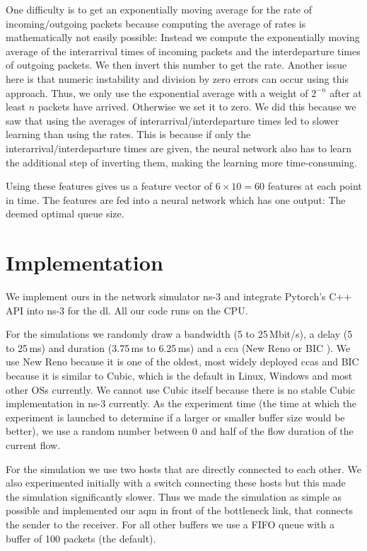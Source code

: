 \documentclass[conference]{IEEEtran}
\begin{document}
One difficulty is to get an exponentially moving average for the rate of incoming/outgoing packets because computing the average of rates is mathematically not easily possible: Instead we compute the exponentially moving average of the interarrival times of incoming packets and the interdeparture times of outgoing packets. We then invert this number to get the rate. Another issue here is that numeric instability and division by zero errors can occur using this approach. Thus, we only use the exponential average with a weight of $2^{-n}$ after at least $n$ packets have arrived. Otherwise we set it to zero. We did this because we saw that using the averages of interarrival/interdeparture times led to slower learning than using the rates. This is because if only the interarrival/interdeparture times are given, the neural network also has to learn the additional step of inverting them, making the learning more time-consuming. 

Using these features gives us a feature vector of $6\times 10 = 60$ features at each point in time. The features are fed into a neural network which has one output: The deemed optimal queue size.  

\section{Implementation} 

We implement \gls{ours} in the network simulator ns-3 \cite{nsnam_ns-3_nodate} and integrate Pytorch's \cite{paszke_pytorch_2019} C++ API into ns-3 for the \gls{dl}. All our code runs on the CPU. 

For the simulations we randomly draw a bandwidth (5 to 25\,Mbit/s), a delay (5 to 25\,ms) and duration (3.75\,ms to 6.25\,ms) and a \gls{cca} (New Reno or BIC \cite{lisong_xu_binary_2004}). We use New Reno because it is one of the oldest, most widely deployed \glspl{cca} and BIC because it is similar to Cubic, which is the default in Linux, Windows and most other OSs currently. We cannot use Cubic itself because there is no stable Cubic implementation in ns-3 currently. As the experiment time (the time at which the experiment is launched to determine if a larger or smaller buffer size would be better), we use a random number between 0 and half of the flow duration of the current flow. 

For the simulation we use two hosts that are directly connected to each other. We also experimented initially with a switch connecting these hosts but this made the simulation significantly slower. Thus we made the simulation as simple as possible and implemented our \gls{aqm} in front of the bottleneck link, that connects the sender to the receiver. For all other buffers we use a FIFO queue with a buffer of 100 packets (the default). 
\end{document}

